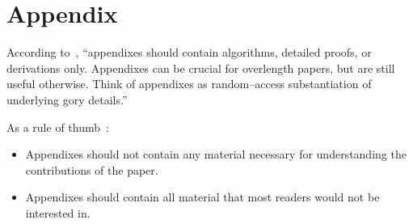 \section{Appendix}

According to~\cite{JW06}, \enquote{appendixes should contain algorithms, detailed proofs, or
derivations only.  Appendixes can be crucial for overlength papers, but are still useful otherwise.
Think of appendixes as random--access substantiation of underlying gory details.}

As a rule of thumb~\cite{JW06}:
\begin{itemize}
    \item Appendixes should not contain any material necessary for understanding the contributions of the paper.
    \item Appendixes should contain all material that most readers would not be interested in.
\end{itemize}
